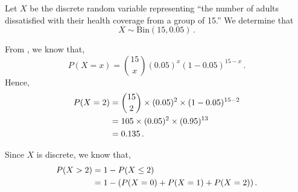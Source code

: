 %
%


\begin{subquestions}
	
\subquestion

\begin{subsubquestions}
	
\subsubquestion

Let $X$ be the discrete random variable representing ``the number of adults dissatisfied with their health coverage from a group of 15.'' We determine that
\begin{equation}
	X \sim \text{Bin}(15, 0.05) \,.
\end{equation}

\begin{subsubsubquestions}
	
\subsubsubquestion
From , we know that,
\begin{equation}
	P(X = x) = { 15 \choose x} (0.05)^x (1-0.05)^{15-x} \,. \label{2005:q4:Bin1}
\end{equation}
Hence,
\begin{align}
	P(X=2) & = { 15 \choose 2} \times (0.05)^2 \times (1-0.05)^{15-2} \nonumber \\
	       & = 105 \times (0.05)^2 \times (0.95)^{13} \nonumber \\
	       & = 0.135 \,.
\end{align}


\subsubsubquestion
Since $X$ is discrete, we know that,
\begin{align}
	P(X>2) &= 1 - P(X\leq2) \nonumber \\
				&= 1 - (P(X=0)+P(X=1)+P(X=2)) \,. \label{2005:q4:DisBin}
\end{align}


\end{subsubsubquestions}
\end{subsubquestions}
\end{subquestions}

